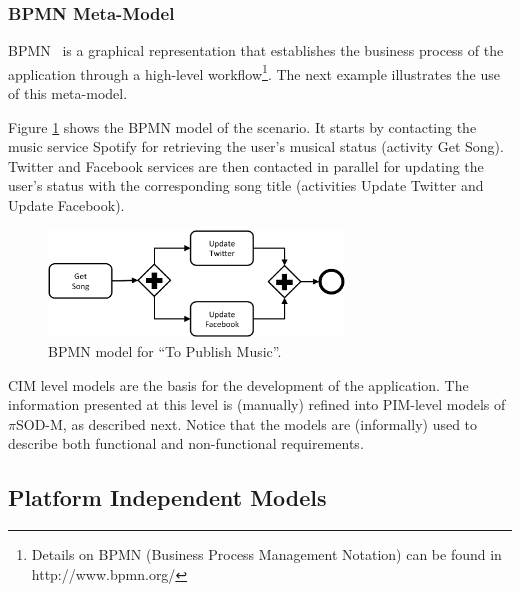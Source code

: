\documentclass{singlecol-new}
\theoremstyle{TH}{
\newtheorem{lemma}{Lemma}
\newtheorem{theorem}[lemma]{Theorem}
\newtheorem{corrolary}[lemma]{Corrolary}
\newtheorem{conjecture}[lemma]{Conjecture}
\newtheorem{proposition}[lemma]{Proposition}
\newtheorem{claim}[lemma]{Claim}
\newtheorem{stheorem}[lemma]{Wrong Theorem}
\newtheorem{algorithm}{Algorithm}
}
\theoremstyle{THrm}{
\newtheorem{definition}{Definition}[section]
\newtheorem{question}{Question}[section]
\newtheorem{remark}{Remark}
\newtheorem{scheme}{Scheme}
}
\theoremstyle{THhit}{
\newtheorem{case}{Case}[section]
}
\theoremstyle{THhsl}{
\newtheorem{example}{Example}
}
\newcommand{\pisodm}[0]{$\pi$SOD-M\xspace}
\begin{document}
\subsubsection{BPMN Meta-Model}

BPMN~\cite{BPMN}  is a graphical representation that establishes the business process of the application through a high-level workflow\footnote{Details on BPMN (Business Process Management Notation) can be found in http://www.bpmn.org/}.
The next example illustrates the use of this meta-model.

\begin{example}\label{ex:toPublicMusicBPMN}
Figure \ref{fig:CIM:tpmbpmn} shows the BPMN model of the scenario.
It starts by contacting the music service Spotify for retrieving the user's  musical status (activity {\sf Get Song}).
Twitter and Facebook services are then contacted in parallel for updating the user's status with the corresponding song title (activities {\sf Update Twitter} and {\sf Update Facebook}).
\end{example}
%
\begin{figure}[h]
\center
\includegraphics[width=0.7\textwidth]{./figures/SC.pdf}
\caption{\label{fig:CIM:tpmbpmn} BPMN model for ``To Publish Music''.}
\end{figure}

CIM level models are the basis for the development of the application.
The information presented at this level is (manually) refined into PIM-level models of \pisodm, as described next.
Notice that the models are (informally) used to describe both functional and non-functional requirements.

\subsection{Platform Independent Models}
\end{document}
